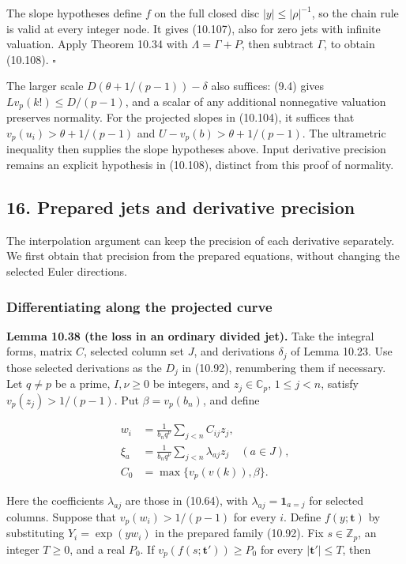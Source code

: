 \documentclass[
  11pt,
  a4paper,
]{article}
\begin{document}
The slope hypotheses define \(f\) on the full closed disc
\(|y|\le|\rho|^{-1}\), so the chain rule is valid at every integer node.
It gives (10.107), also for zero jets with infinite valuation. Apply
Theorem 10.34 with \(\Lambda=\Gamma+P\), then subtract \(\Gamma\), to
obtain (10.108). \(\square\)

The larger scale \(D(\theta+1/(p-1))-\delta\) also suffices: (9.4) gives
\(L v_p(k!)\le D/(p-1)\), and a scalar of any additional nonnegative
valuation preserves normality. For the projected slopes in (10.104), it
suffices that \(v_p(u_i)>\theta+1/(p-1)\) and
\(U-v_p(b)>\theta+1/(p-1)\). The ultrametric inequality then supplies
the slope hypotheses above. Input derivative precision remains an
explicit hypothesis in (10.108), distinct from this proof of normality.

\subsection{16. Prepared jets and derivative
precision}\label{prepared-jets-and-derivative-precision}

The interpolation argument can keep the precision of each derivative
separately. We first obtain that precision from the prepared equations,
without changing the selected Euler directions.

\subsubsection{Differentiating along the projected
curve}\label{differentiating-along-the-projected-curve}

\textbf{Lemma 10.38 (the loss in an ordinary divided jet).} Take the
integral forms, matrix \(C\), selected column set \(J\), and derivations
\(\delta_j\) of Lemma 10.23. Use those selected derivations as the
\(D_j\) in (10.92), renumbering them if necessary. Let \(q\ne p\) be a
prime, \(I,\nu\ge0\) be integers, and \(z_j\in\mathbb C_p\),
\(1\le j<n\), satisfy \(v_p(z_j)>1/(p-1)\). Put \(\beta=v_p(b_n)\), and
define

\[
\begin{aligned}
w_i&=\frac1{b_nq^\nu}\sum_{j<n}C_{ij}z_j,\\
\xi_a&=\frac1{b_nq^\nu}\sum_{j<n}\lambda_{aj}z_j\quad(a\in J),\\
C_0&=\max\{v_p(v(k)),\beta\}.
\end{aligned}
\tag{10.109}
\]

Here the coefficients \(\lambda_{aj}\) are those in (10.64), with
\(\lambda_{aj}=\mathbf1_{a=j}\) for selected columns. Suppose that
\(v_p(w_i)>1/(p-1)\) for every \(i\). Define \(f(y;\boldsymbol t)\) by
substituting \(Y_i=\exp(yw_i)\) in the prepared family (10.92). Fix
\(s\in\mathbb Z_p\), an integer \(T\ge0\), and a real \(P_0\). If
\(v_p(f(s;\boldsymbol t'))\ge P_0\) for every \(|\boldsymbol t'|\le T\),
then
\end{document}

